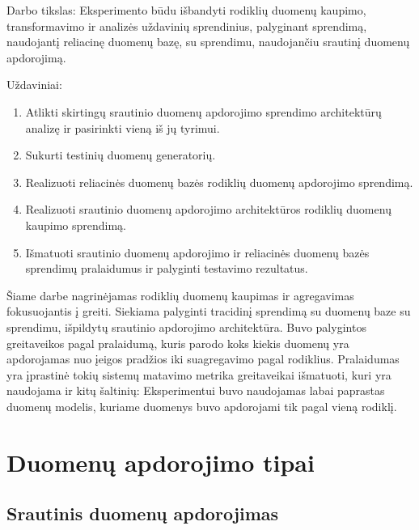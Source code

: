 \documentclass{VUMIFPSkursinis}
\begin{document}
Darbo tikslas: Eksperimento būdu išbandyti rodiklių duomenų kaupimo, transformavimo ir analizės uždavinių sprendinius, 
palyginant sprendimą, naudojantį reliacinę duomenų bazę, su sprendimu, naudojančiu srautinį duomenų apdorojimą. \par
\newpage
Uždaviniai:
\begin{enumerate}
    \item Atlikti skirtingų srautinio duomenų apdorojimo sprendimo architektūrų analizę ir pasirinkti vieną iš jų tyrimui.
    \item Sukurti testinių duomenų generatorių.
    \item Realizuoti reliacinės duomenų bazės rodiklių duomenų apdorojimo sprendimą.
    \item Realizuoti srautinio duomenų apdorojimo architektūros rodiklių duomenų kaupimo sprendimą.
    \item Išmatuoti srautinio duomenų apdorojimo ir reliacinės duomenų bazės sprendimų pralaidumus ir palyginti testavimo rezultatus.
\end{enumerate}
Šiame darbe nagrinėjamas rodiklių duomenų kaupimas ir agregavimas fokusuojantis į greiti. Siekiama palyginti tracidinį sprendimą su duomenų baze su sprendimu,
išpildytų srautinio apdorojimo architektūra. Buvo palygintos greitaveikos pagal pralaidumą, kuris parodo koks kiekis duomenų yra apdorojamas nuo įeigos pradžios iki
suagregavimo pagal rodiklius. Pralaidumas yra įprastinė tokių sistemų matavimo metrika greitaveikai išmatuoti, kuri yra naudojama ir kitų šaltinių: 
\cite{karimov2018benchmarking, Lopez2016APC chintapalli2016benchmarking.} 
Eksperimentui buvo naudojamas labai paprastas duomenų modelis, kuriame duomenys buvo apdorojami tik pagal vieną rodiklį.

\section{Duomenų apdorojimo tipai}

\subsection{Srautinis duomenų apdorojimas} \label{strprocess}
\end{document}
